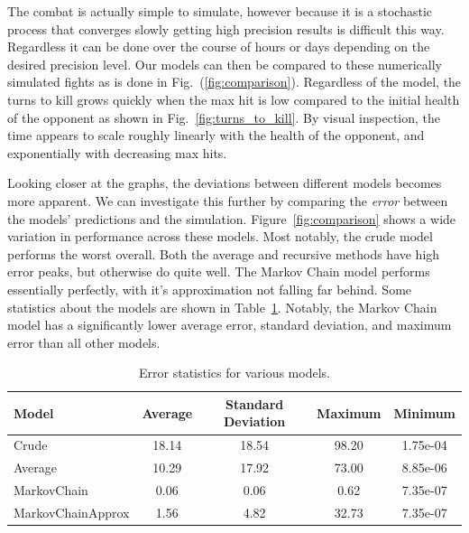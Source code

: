 		The combat is actually simple to simulate, however because it is a stochastic process that converges slowly getting high precision results is difficult this way. Regardless it can be done over the course of hours or days depending on the desired precision level. Our models can then be compared to these numerically simulated fights as is done in Fig.~(\ref{fig:comparison}). Regardless of the model, the turns to kill grows quickly when the max hit is low compared to the initial health of the opponent as shown in Fig.~\ref{fig:turns_to_kill}. By visual inspection, the time appears to scale roughly linearly with the health of the opponent, and exponentially with decreasing max hits.

		Looking closer at the graphs, the deviations between different models becomes more apparent. We can investigate this further by comparing the \textit{error} between the models' predictions and the simulation. Figure~\ref{fig:comparison} shows a wide variation in performance across these models. Most notably, the crude model performs the worst overall. Both the average and recursive methods have high error peaks, but otherwise do quite well. The Markov Chain model performs essentially perfectly, with it's approximation not falling far behind. Some statistics about the models are shown in Table~\ref{table:model_comp_stats}. Notably, the Markov Chain model has a significantly lower average error, standard deviation, and maximum error than all other models.

		\begin{table}[h]
		        \centering
		        \begin{tabular}{ l | c c c c }
		                Model & Average & Standard Deviation & Maximum & Minimum \\
		                \hline\hline
		                Crude & 18.14 & 18.54 & 98.20 & 1.75e-04 \\
		                Average & 10.29 & 17.92 & 73.00 & 8.85e-06 \\
		                MarkovChain & 0.06 & 0.06 & 0.62 & 7.35e-07 \\
		                MarkovChainApprox & 1.56 & 4.82 & 32.73 & 7.35e-07 \\
		        \end{tabular}
		        \caption{Error statistics for various models.}
		        \label{table:model_comp_stats}
		\end{table}

